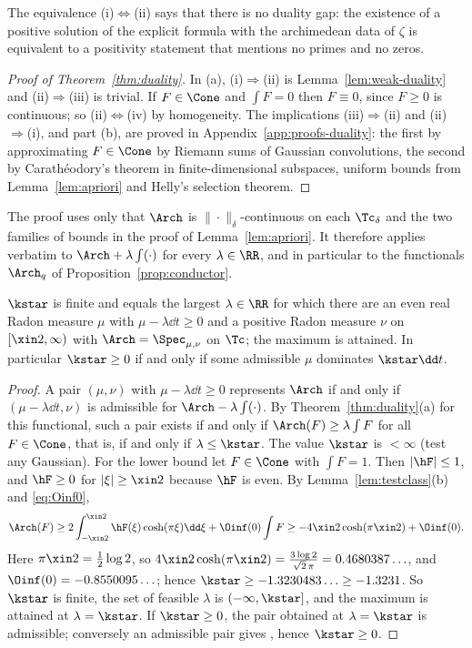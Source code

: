 The equivalence (i)$\Leftrightarrow$(ii) says that there is no duality gap: the existence of a positive solution of the
explicit formula with the archimedean data of $\zeta$ is equivalent to a positivity statement that mentions no primes and
no zeros.

\begin{proof}[Proof of Theorem~\textup{\ref{thm:duality}}]
In (a), (i)$\Rightarrow$(ii) is Lemma~\ref{lem:weak-duality} and (ii)$\Rightarrow$(iii) is trivial. If $F\in\Cone$ and
$\int F=0$ then $F\equiv0$, since $F\ge0$ is continuous; so (ii)$\Leftrightarrow$(iv) by homogeneity. The implications
(iii)$\Rightarrow$(ii) and (ii)$\Rightarrow$(i), and part (b), are proved in Appendix~\ref{app:proofs-duality}: the
first by approximating $F\in\Cone$ by Riemann sums of Gaussian convolutions, the second by Carath\'eodory's theorem in
finite-dimensional subspaces, uniform bounds from Lemma~\ref{lem:apriori} and Helly's selection theorem.
\end{proof}

The proof uses only that $\Arch$ is $\|\cdot\|_\delta$-continuous on each $\Tc_\delta$ and the two families of bounds in
the proof of Lemma~\ref{lem:apriori}. It therefore applies verbatim to $\Arch+\lambda\int(\cdot)$ for every
$\lambda\in\RR$, and in particular to the functionals $\Arch_q$ of Proposition~\ref{prop:conductor}.

\begin{proposition}[Floors]\label{prop:floor}
$\kstar$ is finite and equals the largest $\lambda\in\RR$ for which there are an even real Radon measure $\mu$ with
$\mu-\lambda\dd t\ge0$ and a positive Radon measure $\nu$ on $[\xin2,\infty)$ with $\Arch=\Spec_{\mu,\nu}$ on $\Tc$; the
maximum is attained. In particular $\kstar\ge0$ if and only if some admissible $\mu$ dominates $\kstar\dd t$.
\end{proposition}

\begin{proof}
A pair $(\mu,\nu)$ with $\mu-\lambda\dd t\ge0$ represents $\Arch$ if and only if $(\mu-\lambda\dd t,\nu)$ is admissible for
$\Arch-\lambda\int(\cdot)$. By Theorem~\ref{thm:duality}(a) for this functional, such a pair exists if and only if
$\Arch(F)\ge\lambda\int F$ for all $F\in\Cone$, that is, if and only if $\lambda\le\kstar$. The value $\kstar$ is
$<\infty$ (test any Gaussian). For the lower bound let $F\in\Cone$ with $\int F=1$. Then $|\hF|\le1$, and $\hF\ge0$ for
$|\xi|\ge\xin2$ because $\hF$ is even. By Lemma~\ref{lem:testclass}(b) and \eqref{eq:Oinf0},
\[
\Arch(F)\ge2\int_{-\xin2}^{\xin2}\hF(\xi)\cosh(\pi\xi)\dd\xi+\Oinf(0)\int F\ge-4\xin2\cosh(\pi\xin2)+\Oinf(0).
\]
Here $\pi\xin2=\frac12\log2$, so $4\xin2\cosh(\pi\xin2)=\frac{3\log2}{\sqrt2\,\pi}=0.4680387\ldots$, and
$\Oinf(0)=-0.8550095\ldots$; hence $\kstar\ge-1.3230483\ldots\ge-1.3231$. So $\kstar$ is finite, the set of feasible $\lambda$ is $(-\infty,\kstar]$, and the maximum is
attained at $\lambda=\kstar$. If $\kstar\ge0$, the pair obtained at $\lambda=\kstar$ is admissible; conversely an
admissible pair gives \condE, hence $\kstar\ge0$.
\end{proof}

